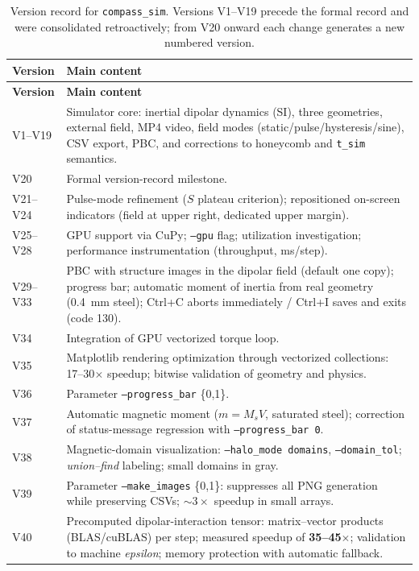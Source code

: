 \documentclass[11pt,a4paper]{article}
\newcommand{\code}[1]{\texttt{#1}}
\begin{document}
\begin{longtable}{@{}lp{11.5cm}@{}}
\caption{Version record for \code{compass\_sim}. Versions V1--V19 precede the formal record and were consolidated retroactively; from V20 onward each change generates a new numbered version.}
\label{tab:versoes} \\
\toprule
\textbf{Version} & \textbf{Main content} \\
\midrule
\endfirsthead
\toprule
\textbf{Version} & \textbf{Main content} \\
\midrule
\endhead
\bottomrule
\endfoot
\bottomrule
\endlastfoot
V1--V19 & Simulator core: inertial dipolar dynamics (SI), three geometries, external field, MP4 video, field modes (static/pulse/hysteresis/sine), CSV export, PBC, and corrections to honeycomb and \code{t\_sim} semantics. \\
V20 & Formal version-record milestone. \\
V21--V24 & Pulse-mode refinement ($S$ plateau criterion); repositioned on-screen indicators (field at upper right, dedicated upper margin). \\
V25--V28 & GPU support via CuPy; \code{--gpu} flag; utilization investigation; performance instrumentation (throughput, ms/step). \\
V29--V33 & PBC with structure images in the dipolar field (default one copy); progress bar; automatic moment of inertia from real geometry (\SI{0.4}{mm} steel); Ctrl+C aborts immediately / Ctrl+I saves and exits (code 130). \\
V34 & Integration of GPU vectorized torque loop. \\
V35 & Matplotlib rendering optimization through vectorized collections: 17--30$\times$ speedup; bitwise validation of geometry and physics. \\
V36 & Parameter \code{--progress\_bar} \{0,1\}. \\
V37 & Automatic magnetic moment ($m = M_s V$, saturated steel); correction of status-message regression with \code{--progress\_bar 0}. \\
V38 & Magnetic-domain visualization: \code{--halo\_mode domains}, \code{--domain\_tol}; \emph{union--find} labeling; small domains in gray. \\
V39 & Parameter \code{--make\_images} \{0,1\}: suppresses all PNG generation while preserving CSVs; $\sim 3\times$ speedup in small arrays. \\
V40 & Precomputed dipolar-interaction tensor: matrix--vector products (BLAS/cuBLAS) per step; measured speedup of \textbf{35--45$\times$}; validation to machine \emph{epsilon}; memory protection with automatic fallback. \\

\end{longtable}
\end{document}
